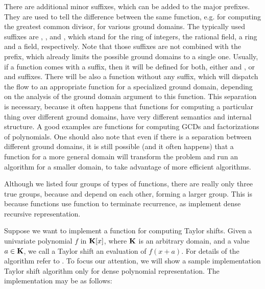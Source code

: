 There are additional minor suffixes, which can be added to the major prefixes. They are used to tell
the difference between the same function, e.g. for computing the greatest common divisor, for various
ground domains. The typically used suffixes are , ,  and , which stand
for the ring of integers, the rational field, a ring and a field, respectively. Note that those
suffixes are not combined with the  prefix, which already limits the possible ground domains
to a single one. Usually, if a function comes with a suffix, then it will be defined for both, either
 and , or  and  suffixes. There will be also a function without any suffix,
which will dispatch the flow to an appropriate function for a specialized ground domain, depending on
the analysis of the ground domain argument to this function. This separation is necessary, because it
often happens that functions for computing a particular thing over different ground domains, have very
different semantics and internal structure. A good examples are functions for computing GCDs and
factorizations of polynomials. One should also note that even if there is a separation between different
ground domains, it is still possible (and it often happens) that a function for a more general domain
will transform the problem and run an algorithm for a smaller domain, to take advantage of more efficient
algorithms.

Although we listed four groups of types of functions, there are really only three true groups, because
 and  depend on each other, forming a larger group. This is because  functions
use  function to terminate recurrence, as  implement dense recursive representation.

Suppose we want to implement a function for computing Taylor shifts. Given a univariate polynomial
$f$ in $\mathbf{K}[x]$, where $\mathbf{K}$ is an arbitrary domain, and a value $a \in \mathbf{K}$, we call a Taylor shift an
evaluation of $f(x + a)$. For details of the algorithm refer to \cite{Nijenhuis1978combinatorial}. To focus
our attention, we will show a sample implementation Taylor shift algorithm only for dense polynomial
representation. The implementation may be as follows:

